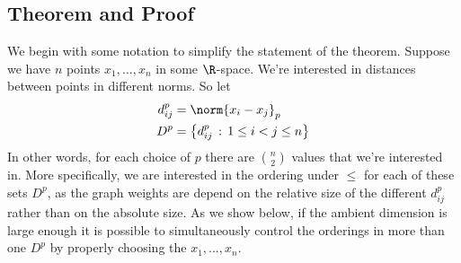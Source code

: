 \documentclass[journal]{IEEEtran}
\begin{document}
\subsection{Theorem and Proof}

We begin with some notation to simplify the statement of the theorem. Suppose we have $n$ points $x_1,\ldots,x_n$ in some $\R$-space. We're interested in distances between points in different norms. So let
\begin{align}
  d_{ij}^p &= \norm{x_i - x_j}_p \\
  D^p &= \left\{d_{ij}^p \,:\, 1\leq i < j \leq n\right\}
\end{align}
In other words, for each choice of $p$ there are $n \choose 2$ values that we're interested in. More specifically, we are interested in the ordering under $\leq$ for each of these sets $D^p$, as the graph weights are depend on the relative size of the different $d_{ij}^p$ rather than on the absolute size. As we show below, if the ambient dimension is large enough it is possible to simultaneously control the orderings in more than one $D^p$ by properly choosing the $x_1,\ldots,x_n$.
\end{document}
